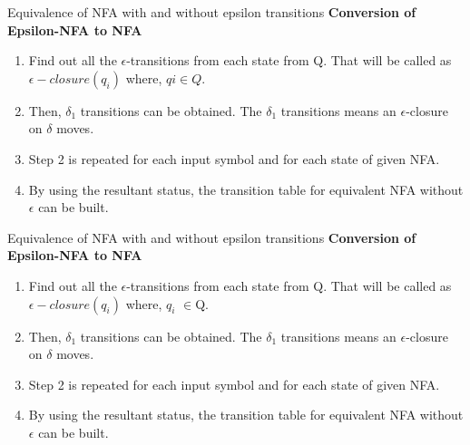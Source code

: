\documentclass{beamer}
\begin{document}
\begin{frame}{Equivalence of NFA with and without epsilon transitions}
	\textbf{Conversion of Epsilon-NFA to NFA}
	\begin{enumerate}
		\item Find out all the $\epsilon$-transitions from each state from Q. That will be called as $\epsilon-closure(q_i)$ where, $qi \in Q$.
		\item Then, $\delta_1$ transitions can be obtained. The $\delta_1$ transitions means an $\epsilon$-closure on $\delta$ moves.
		\item Step 2 is repeated for each input symbol and for each state of given
		 NFA.
		\item By using the resultant status, the transition table for equivalent NFA without $\epsilon$ can be built.
	\end{enumerate}
\end{frame}
\begin{frame}{Equivalence of NFA with and without epsilon transitions}
	\textbf{Conversion of Epsilon-NFA to NFA}
	\begin{enumerate}
		\item Find out all the $\epsilon$-transitions from each state from Q. That will be called as $\epsilon-closure(q_i)$ where, $q_i$ $\in$Q.
		\item Then, $\delta_1$ transitions can be obtained. The $\delta_1$ transitions means an $\epsilon$-closure on $\delta$ moves.
		\item Step 2 is repeated for each input symbol and for each state of given NFA.
		\item By using the resultant status, the transition table for equivalent NFA without $\epsilon$ can be built.
	\end{enumerate}
\end{frame}
\end{document}
